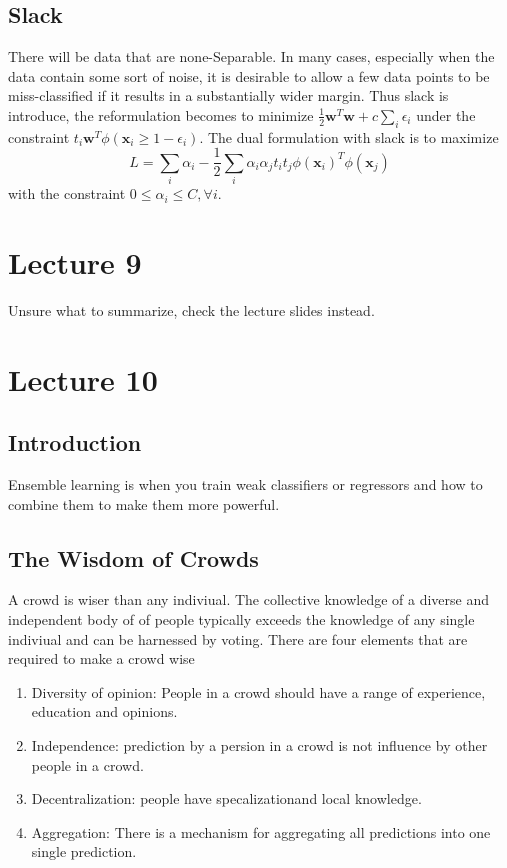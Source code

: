 \documentclass[12pt]{article}
\numberwithin{equation}{section}
\begin{document}
\subsection{Slack}
There will be data that are none-Separable. In many cases, especially when the data contain some sort of noise, it is desirable to allow a few data points to be miss-classified if it results in a substantially wider margin. Thus slack is introduce, the reformulation becomes to minimize $\frac{1}{2} \bm{w}^T \bm{w} + c \sum_i \epsilon_i$ under the constraint $t_i \bm{w}^T \phi (\bm{x}_i \geq 1 - \epsilon_i)$. The dual formulation with slack is to maximize
\begin{equation}
    L = \sum_i \alpha_i - \frac{1}{2} \sum_i \alpha_i \alpha_j t_i t_j \phi (\bm{x}_i)^T \phi (\bm{x}_j)
\end{equation}
with the constraint $ 0 \leq \alpha_i \leq C, \forall i$.


\section{Lecture 9}
Unsure what to summarize, check the lecture slides instead.
\section{Lecture 10}

\subsection{Introduction}

Ensemble learning is when you train weak classifiers or regressors and how to combine them to make them more powerful.

\subsection{The Wisdom of Crowds}
A crowd is wiser than any indiviual. The collective knowledge of a diverse and independent body of of people typically exceeds the knowledge of any single indiviual and can be harnessed by voting. There are four elements that are required to make a crowd wise
\begin{enumerate}
\item
Diversity of opinion: People in a crowd should have a range of experience, education and opinions.
\item
Independence: prediction by a persion in a crowd is not influence by other people in a crowd.
\item 
Decentralization: people have specalizationand local knowledge.
\item
Aggregation: There is a mechanism for aggregating all predictions into one single prediction.
\end{enumerate}
\end{document}
